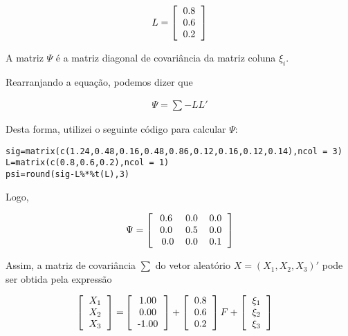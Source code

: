 \documentclass[11pt,a4paper]{book}
\begin{document}
\begin{enumerate}
			\begin{eqnarray*}
				L=\left[
				\begin{tabular}{c}
				0.8\\
				0.6\\
				0.2
				\end{tabular}
				\right]
			\end{eqnarray*}
			
			A matriz $\Psi$ é a matriz diagonal de covariância da matriz coluna $\xi_i$.
			
			Rearranjando a equação, podemos dizer que
			
			\begin{eqnarray*}
				\Psi= \sum - LL'
			\end{eqnarray*}
			
			Desta forma, utilizei o seguinte código para calcular $\Psi$:
			
			\begin{lstlisting}
sig=matrix(c(1.24,0.48,0.16,0.48,0.86,0.12,0.16,0.12,0.14),ncol = 3)
L=matrix(c(0.8,0.6,0.2),ncol = 1)
psi=round(sig-L%*%t(L),3)
			\end{lstlisting}
			
			Logo,
			
			\begin{eqnarray*}
				\Psi= \left[
				\begin{tabular}{c c c}
				0.6 & 0.0 & 0.0\\
				0.0 & 0.5 & 0.0\\\
				0.0 & 0.0 & 0.1
				\end{tabular}
				\right]
			\end{eqnarray*}
			
			Assim, a matriz de covariância $\sum$ do vetor aleatório $X=(X_1,X_2,X_3)'$ pode ser obtida pela expressão
			
			\begin{eqnarray*}
				\left[
				\begin{tabular}{c}
				$X_1$\\
				$X_2$\\
				$X_3$
				\end{tabular}
				\right]=&\left[
				\begin{tabular}{c}
				1.00\\
				0.00\\
				-1.00
				\end{tabular}
				\right]+\left[
				\begin{tabular}{c}
				0.8\\
				0.6\\
				0.2
				\end{tabular}
				\right]F+\left[
				\begin{tabular}{c}
				$\xi_1$\\
				$\xi_2$\\
				$\xi_3$
				\end{tabular}
				\right]
			\end{eqnarray*}
			 

\end{enumerate}
\end{document}
